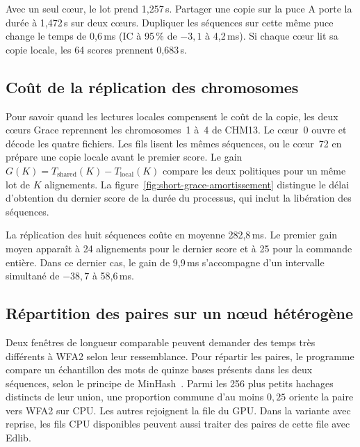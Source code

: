 Avec un seul cœur, le lot prend 1,257\,s. Partager une copie sur la puce A porte la durée à 1,472\,s sur deux cœurs. Dupliquer les séquences sur cette même puce change le temps de 0,6\,ms (IC à 95\,\% de \(-3{,}1\) à 4,2\,ms). Si chaque cœur lit sa copie locale, les 64 scores prennent 0,683\,s.

\subsection{Coût de la réplication des chromosomes}
Pour savoir quand les lectures locales compensent le coût de la copie, les deux cœurs Grace reprennent les chromosomes~1 à~4 de CHM13. Le cœur~0 ouvre et décode les quatre fichiers. Les fils lisent les mêmes séquences, ou le cœur~72 en prépare une copie locale avant le premier score. Le gain \(G(K)=T_{\mathrm{shared}}(K)-T_{\mathrm{local}}(K)\) compare les deux politiques pour un même lot de \(K\) alignements. La figure~\ref{fig:short-grace-amortissement} distingue le délai d’obtention du dernier score de la durée du processus, qui inclut la libération des séquences.

La réplication des huit séquences coûte en moyenne 282,8\,ms. Le premier gain moyen apparaît à 24 alignements pour le dernier score et à 25 pour la commande entière. Dans ce dernier cas, le gain de 9,9\,ms s’accompagne d’un intervalle simultané de \(-38{,}7\) à 58,6\,ms.


\subsection{Répartition des paires sur un nœud hétérogène}
Deux fenêtres de longueur comparable peuvent demander des temps très différents à WFA2 selon leur ressemblance. Pour répartir les paires, le programme compare un échantillon des mots de quinze bases présents dans les deux séquences, selon le principe de MinHash~\cite{mash}. Parmi les 256 plus petits hachages distincts de leur union, une proportion commune d’au moins \(0{,}25\) oriente la paire vers WFA2 sur CPU. Les autres rejoignent la file du GPU. Dans la variante avec reprise, les fils CPU disponibles peuvent aussi traiter des paires de cette file avec Edlib.

